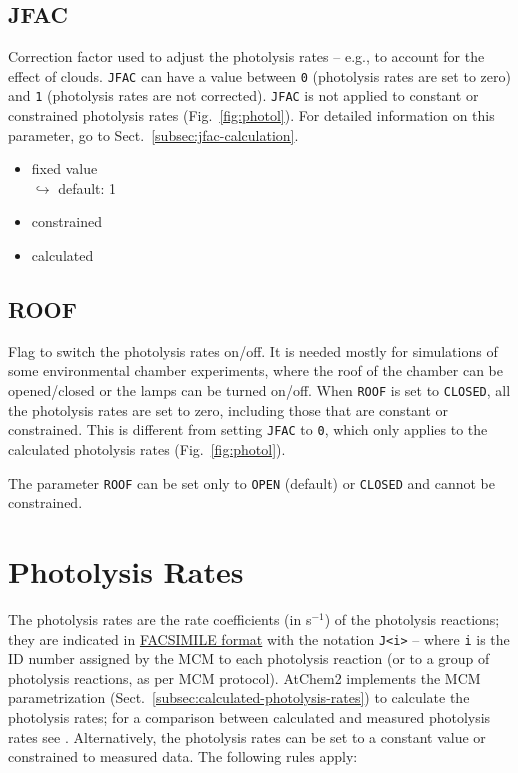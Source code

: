 \subsection{JFAC} \label{subsec:jfac}

Correction factor used to adjust the photolysis rates -- e.g., to account for the effect of
clouds. \texttt{JFAC} can have a value between \texttt{0} (photolysis rates are set to zero)
and \texttt{1} (photolysis rates are not corrected). \texttt{JFAC} is not applied to constant
or constrained photolysis rates (Fig.~\ref{fig:photol}). For detailed information on this
parameter, go to Sect.~\ref{subsec:jfac-calculation}.

\begin{itemize}
\item fixed value\\
  $\hookrightarrow$ default: 1
\item constrained
\item calculated
\end{itemize}

\subsection{ROOF} \label{subsec:roof}

Flag to switch the photolysis rates on/off. It is needed mostly for simulations of some
environmental chamber experiments, where the roof of the chamber can be opened/closed or the
lamps can be turned on/off.  When \texttt{ROOF} is set to \texttt{CLOSED}, all the photolysis
rates are set to zero, including those that are constant or constrained. This is different from
setting \texttt{JFAC} to \texttt{0}, which only applies to the calculated photolysis rates
(Fig.~\ref{fig:photol}).

The parameter \texttt{ROOF} can be set only to \texttt{OPEN} (default) or \texttt{CLOSED} and
cannot be constrained.

\section{Photolysis Rates} \label{sec:photolysis-rates}

The photolysis rates are the rate coefficients (in s$^{-1}$) of the photolysis reactions; they
are indicated in \hyperref[subsec:facsimile-format]{FACSIMILE format} with the notation
\texttt{J<i>} -- where \texttt{i} is the ID number assigned by the MCM to each photolysis
reaction (or to a group of photolysis reactions, as per MCM protocol). AtChem2 implements the
MCM parametrization (Sect.~\ref{subsec:calculated-photolysis-rates}) to calculate the
photolysis rates; for a comparison between calculated and measured photolysis rates see
\citet{sommariva_2020}. Alternatively, the photolysis rates can be set to a constant value or
constrained to measured data. The following rules apply:

